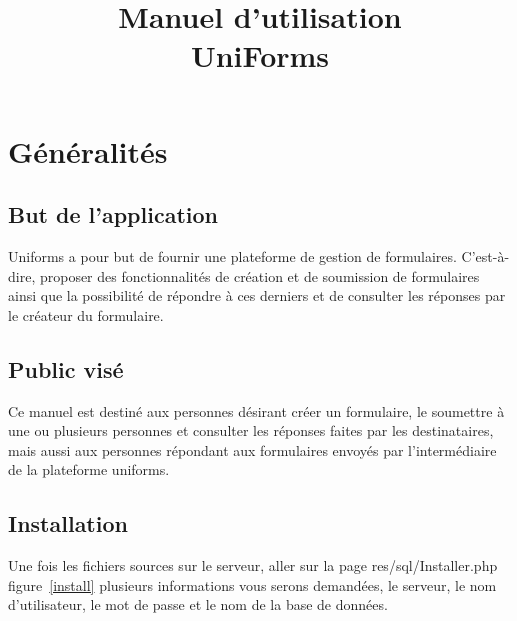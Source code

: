\documentclass[a4paper,11pt,final]{report}
\title{\textbf{Manuel d'utilisation}\\UniForms}
\author{}
\date{}
\begin{document}
\maketitle
\setcounter{page}{2}
\tableofcontents 
\chapter{Généralités}
\section{But de l'application}
Uniforms a pour but de fournir une plateforme de gestion de formulaires. C'est-à-dire, proposer des fonctionnalités de création et de soumission de formulaires ainsi que la possibilité de répondre à ces derniers et de consulter les réponses par le créateur du formulaire.

\section{Public visé}
Ce manuel est destiné aux personnes désirant créer un formulaire, le soumettre à une ou plusieurs personnes et consulter les réponses faites par les destinataires, mais aussi aux personnes répondant aux formulaires envoyés par l'intermédiaire de la plateforme uniforms.

\section{Installation}
Une fois les fichiers sources sur le serveur, aller sur la page res/sql/Installer.php figure~\ref{install} plusieurs informations vous serons demandées, le serveur, le nom d'utilisateur, le mot de passe et le nom de la base de données.

\noindent\begin{minipage}{\linewidth}%
\label{install}
\end{minipage}
\end{document}
